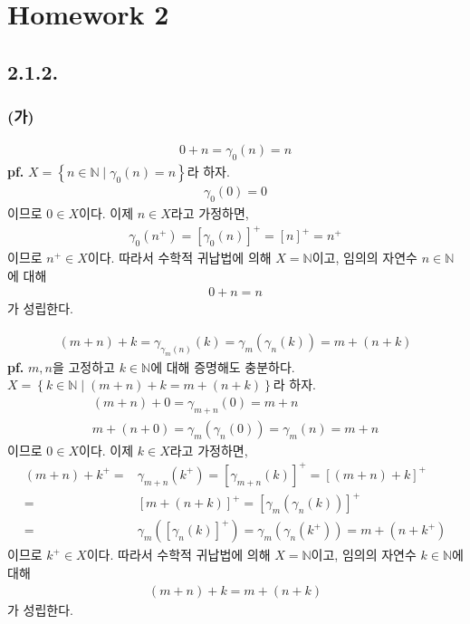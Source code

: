 \documentclass{article}
\begin{document}
\twocolumn



\chapter{Homework 2}

\section{2.1.2.}
\subsection{(가)}
\begin{align*}
0+n = \gamma_0(n) = n
\end{align*}
\textbf{pf.} $X = \left\{ n \in \mathbb{N} \mid \gamma_0(n) = n \right\}$라 하자.
\begin{align*}
\gamma_0(0) = 0
\end{align*}이므로 $0 \in X$이다. 이제 $n \in X$라고 가정하면,
\begin{align*}
\gamma_0(n^+) = [\gamma_0(n)]^+ = [n]^+ = n^+
\end{align*}이므로 $n^+ \in X$이다. 따라서 수학적 귀납법에 의해 $X = \mathbb{N}$이고, 임의의 자연수 $n \in \mathbb{N}$에 대해
\begin{align*}
0 + n = n
\end{align*}가 성립한다.

\begin{align*}
(m+n)+k = \gamma_{\gamma_{m}(n)}(k) = \gamma_{m}(\gamma_{n}(k))=m+(n+k)
\end{align*}
\textbf{pf.} $m, n$을 고정하고 $k \in \mathbb{N}$에 대해 증명해도 충분하다. 
\\$X = \left\{k\in \mathbb{N} \mid (m+n)+k = m+(n+k) \right\}$라 하자.
\begin{align*}
(m+n)+0 = \gamma_{m+n}(0) = m+n
\\ m+(n+0) = \gamma_m(\gamma_n(0)) = \gamma_m(n) = m+n
\end{align*}이므로 $0 \in X$이다. 이제 $k \in X$라고 가정하면,
\begin{align*}
(m+n)+k^+ =& \gamma_{m+n}(k^+) = [\gamma_{m+n}(k)]^+ = [(m+n)+k]^+
\\=&[m+(n+k)]^+ = [\gamma_m(\gamma_n(k))]^+ 
\\ =& \gamma_m([\gamma_n(k)]^+) = \gamma_{m}(\gamma_n(k^+))  = m+(n+k^+) 
\end{align*}이므로 $k^+ \in X$이다. 따라서 수학적 귀납법에 의해 $X = \mathbb{N}$이고, 임의의 자연수 $k \in \mathbb{N}$에 대해
\begin{align*}
(m+n)+k = m+(n+k)
\end{align*}가 성립한다. 
\end{document}
